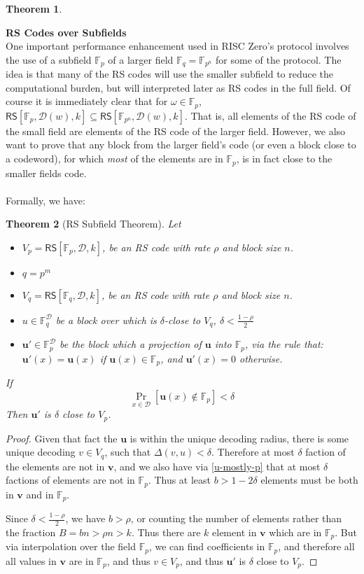 \documentclass[10pt,letterpaper,titlepage]{article}
\newcommand{\GF}[1]{\mathbb{F}_{#1}}
\newcommand{\w}[0]{\omega}
\newcommand{\p}[0]{\rho}
\newcommand{\dd}[0]{\delta}
\newcommand{\D}[0]{\mathcal{D}}
\newtheorem{theorem}{Theorem}
\theoremstyle{definition}
\begin{document}
\begin{appendices}
\begin{theorem}
\end{theorem}
\noindent
\textbf{RS Codes over Subfields}\\
One important performance enhancement used in RISC Zero's protocol involves the use of a subfield $\GF{p}$ of a larger field $\GF{q}=\GF{p^n}$ for some of the protocol.
The idea is that many of the RS codes will use the smaller subfield to reduce the computational burden, but will interpreted later as RS codes in the full field.
Of course it is immediately clear that for $\w \in \GF{p}$, $\mathsf{RS}[\GF{p}, \D(w), k] \subseteq \mathsf{RS}[\GF{p^n}, \D(w), k]$.
That is, all elements of the RS code of the small field are elements of the RS code of the larger field.
However, we also want to prove that any block from the larger field's code (or even a block close to a codeword), for which \emph{most} of the elements are in $\GF{p}$, is in fact close to the smaller fields code.\\
\\
Formally, we have:
\begin{theorem}[RS Subfield Theorem]
  Let
  \begin{itemize}
    \item $V_p = \mathsf{RS}[\GF{p}, \D, k]$, be an RS code with rate $\p$ and block size $n$.
    \item $q = p^m$
    \item $V_q = \mathsf{RS}[\GF{q}, \D, k]$, be an RS code with rate $\p$ and block size $n$.
    \item $u \in \GF{q}^\D$ be a block over which is $\dd$-close to $V_q$, $\dd < \frac{1 - \p}{2}$
    \item $\mathbf{u'} \in \GF{p}^\D$ be the block which a projection of $\mathbf{u}$ into $\GF{p}$, via the rule that:
          $\mathbf{u'}(x) = \mathbf{u}(x)$ if $\mathbf{u}(x) \in \GF{p}$, and $\mathbf{u'}(x) = 0$ otherwise.
  \end{itemize}
  If \begin{equation}
    \label{u-mostly-p}
    \Pr_{x \in \D}[\mathbf{u}(x) \notin \GF{p}] < \dd
  \end{equation}
  Then $\mathbf{u'}$ is $\dd$ close to $V_p$.
\end{theorem}
\begin{proof}
  Given that fact the $\mathbf{u}$ is within the unique decoding radius, there is some unique decoding $v \in V_q$, such that $\Delta(v, u) < \dd$.
  Therefore at most $\dd$ faction of the elements are not in $\mathbf{v}$, and we also have via \ref{u-mostly-p} that at most $\dd$ factions of elements are not in $\GF{p}$.
  Thus at least $b > 1 - 2 \dd$ elements must be both in $\mathbf{v}$ and in $\GF{p}$.

  Since $\dd < \frac{1 - \p}{2}$, we have $b > \p$, or counting the number of elements rather than the fraction $B = b n > \p n > k$.
  Thus there are $k$ element in $\mathbf{v}$ which are in $\GF{p}$.
  But via interpolation over the field $\GF{p}$, we can find coefficients in $\GF{p}$, and therefore all all values in $\mathbf{v}$ are in $\GF{p}$, and thus $v \in V_p$, and thus $\mathbf{u'}$ is $\dd$ close to $V_p$.
\end{proof}
\end{appendices}
\end{document}
